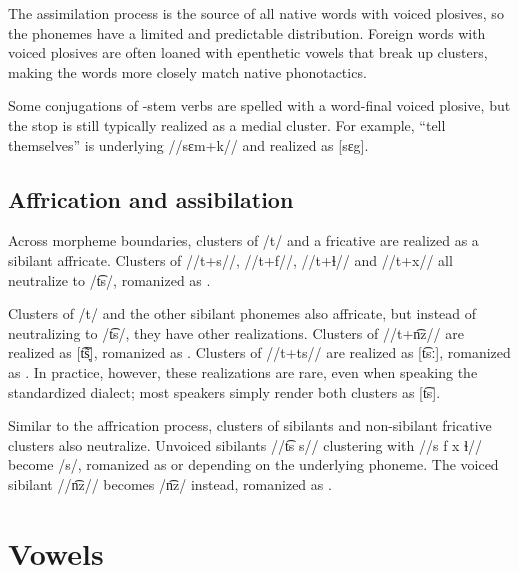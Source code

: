 The assimilation process is the source of all native words with voiced plosives, so the phonemes have a limited and predictable distribution.  Foreign words with voiced plosives are often loaned with epenthetic vowels that break up clusters, making the words more closely match native phonotactics. %

Some conjugations of -stem verbs are spelled with a word-final voiced plosive, but the stop is still typically realized as a medial cluster. For example,  “tell themselves” is underlying //sɛm+k// and realized as [sɛg]. 

\subsection{Affrication and assibilation} \label{sub:affrication}
Across morpheme boundaries, clusters of /t/ and a fricative are realized as a sibilant affricate. Clusters of //t+s//, //t+f//, //t+ɬ// and //t+x// all neutralize to /t͡s/, romanized as . 

Clusters of /t/ and the other sibilant phonemes also affricate, but instead of neutralizing to /t͡s/, they have other realizations. Clusters of //t+n͡z// are realized as [t͡s̞̃], romanized as .  Clusters of //t+ts// are realized as [t͡sː], romanized as . In practice, however, these realizations are rare, even when speaking the standardized dialect; most speakers simply render both clusters as [t͡s].

Similar to the affrication process, clusters of sibilants and non-sibilant fricative clusters also neutralize. Unvoiced sibilants //t͡s s// clustering with //s f x ɬ// become /s/, romanized as  or  depending on the underlying phoneme. The voiced sibilant //n͡z// becomes /n͡z/ instead, romanized as .

\section{Vowels}
